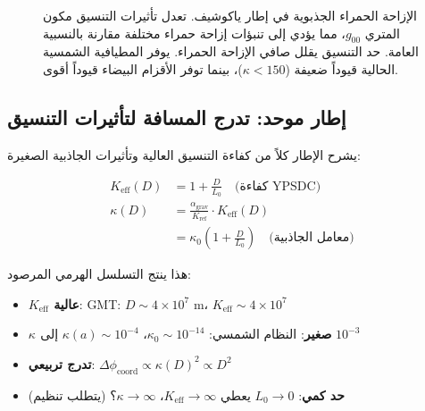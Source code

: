 \documentclass[11pt,a4paper]{article}
\begin{document}
\begin{figure}[htbp]
{
		}
		\caption{الإزاحة الحمراء الجذبوية في إطار ياكوشيف. تعدل تأثيرات التنسيق مكون المتري $g_{00}$، مما يؤدي إلى تنبؤات إزاحة حمراء مختلفة مقارنة بالنسبية العامة. حد التنسيق يقلل صافي الإزاحة الحمراء. يوفر المطيافية الشمسية الحالية قيوداً ضعيفة ($\kappa < 150$)، بينما توفر الأقزام البيضاء قيوداً أقوى.}
		\label{fig:redshift-detailed}
	\end{figure}
	
	\subsection{إطار موحد: تدرج المسافة لتأثيرات التنسيق}
	
	يشرح الإطار كلاً من كفاءة التنسيق العالية وتأثيرات الجاذبية الصغيرة:
	
	\begin{align}
		K_{\mathrm{eff}}(D) &= 1 + \frac{D}{L_0} \quad \text{(كفاءة YPSDC)} \\
		\kappa(D) &= \frac{\alpha_{\text{grav}}}{K_{\text{ref}}} \cdot K_{\mathrm{eff}}(D) \\
		&= \kappa_0 \left(1 + \frac{D}{L_0}\right) \quad \text{(معامل الجاذبية)}
	\end{align}
	
	هذا ينتج التسلسل الهرمي المرصود:
	\begin{itemize}
		\item \textbf{$K_{\mathrm{eff}}$ عالية}: GMT: $D \sim 4\times10^7$ m، $K_{\mathrm{eff}} \sim 4\times10^7$
		\item \textbf{$\kappa$ صغير}: النظام الشمسي: $\kappa_0 \sim 10^{-14}$، $\kappa(a) \sim 10^{-4}$ إلى $10^{-3}$
		\item \textbf{تدرج تربيعي}: $\Delta\phi_{\text{coord}} \propto \kappa(D)^2 \propto D^2$
		\item \textbf{حد كمي}: $L_0 \to 0$ يعطي $K_{\mathrm{eff}} \to \infty$، $\kappa \to \infty$؟ (يتطلب تنظيم)
	\end{itemize}
	
\end{document}
